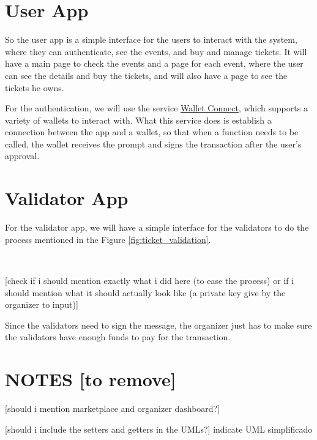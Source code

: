 \section{User App}
\label{sec:user_app}

So the user app is a simple interface for the users to interact with the
system, where they can authenticate, see the events, and buy and manage
tickets. It will have a main page to check the events and a page for each
event, where the user can see the details and buy the tickets, and will also
have a page to see the tickets he owns.

For the authentication, we will use the service
\href{https://walletconnect.com/}{Wallet Connect}, which supports a variety of
wallets to interact with. What this service does is establish a connection
between the app and a wallet, so that when a function needs to be called, the
wallet receives the prompt and signs the transaction after the user's approval.

\section{Validator App}
\label{sec:validator_app}

For the validator app, we will have a simple interface for the validators to do
the process mentioned in the Figure \ref{fig:ticket_validation}.

~

[check if i should mention exactly what i did here (to ease the process) or if i should mention what it should actually look like (a private key give by the organizer to input)]

Since the validators need to sign the message, the organizer just has to make
sure the validators have enough funds to pay for the transaction.

\section{NOTES [to remove]}

 [should i mention marketplace and organizer dashboard?]

 [should i include the setters and getters in the UMLs?] indicate UML simplificado
